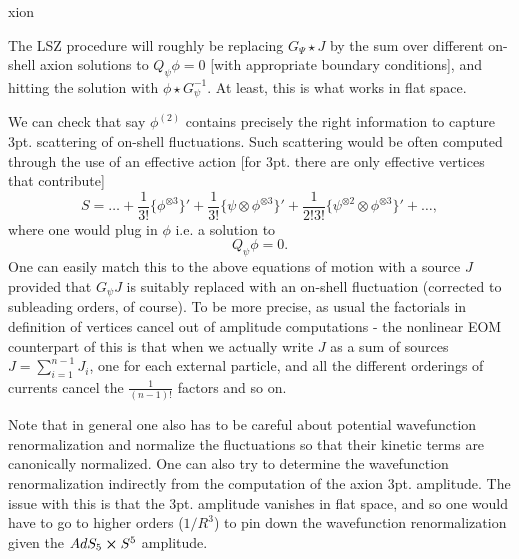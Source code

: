 xion\documentclass[12pt]{article}
\def\be{\begin{equation}}
\def\ee{\end{equation}}
\numberwithin{equation}{section}
\begin{document}
The LSZ procedure will roughly be replacing $G_\Psi \star J$ by the sum over different on-shell axion solutions to $Q_\psi \phi = 0$ [with appropriate boundary conditions], and hitting the solution with $\phi \star G_\psi^{-1}$. At least, this is what works in flat space.



We can check that say $\phi^{(2)}$ contains precisely the right information to capture 3pt. scattering of on-shell fluctuations. Such scattering would be often computed through the use of an effective action [for 3pt. there are only effective vertices that contribute]
\be
S = \ldots + \frac{1}{3!} \{\phi^{\otimes 3}\}' + \frac{1}{3!} \{\psi \otimes \phi^{\otimes 3}\}' + \frac{1}{2! 3!} \{\psi^{\otimes 2} \otimes \phi^{\otimes 3}\}' + \ldots,
\ee
where one would plug in $\phi$ i.e. a solution to
\be
Q_\psi \phi = 0 .
\ee
One can easily match this to the above equations of motion with a source $J$ provided that $G_\psi J$ is suitably replaced with an on-shell fluctuation (corrected to subleading orders, of course). To be more precise, as usual the factorials in definition of vertices cancel out of amplitude computations - the nonlinear EOM counterpart of this is that when we actually write $J$ as a sum of sources $J = \sum_{i=1}^{n-1} J_i$, one for each external particle, and all the different orderings of currents cancel the $\frac{1}{(n-1)!}$ factors and so on.

Note that in general one also has to be careful about potential wavefunction renormalization and normalize the fluctuations so that their kinetic terms are canonically normalized. One can also try to determine the wavefunction renormalization indirectly from the computation of the axion 3pt. amplitude. The issue with this is that the 3pt. amplitude vanishes in flat space, and so one would have to go to higher orders ($1/R^3$) to pin down the wavefunction renormalization given the $AdS_5 \cross S^5$ amplitude.

\appendix
\end{document}
